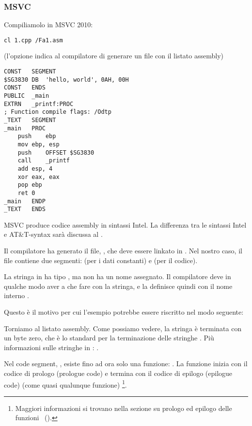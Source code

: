 \subsubsection{MSVC}

Compiliamolo in MSVC 2010:

\begin{lstlisting}
cl 1.cpp /Fa1.asm
\end{lstlisting}

(l'opzione  indica al compilatore di generare un file con il listato assembly)

\begin{lstlisting}[caption=MSVC 2010,style=customasmx86]
CONST	SEGMENT
$SG3830	DB	'hello, world', 0AH, 00H
CONST	ENDS
PUBLIC	_main
EXTRN	_printf:PROC
; Function compile flags: /Odtp
_TEXT	SEGMENT
_main	PROC
	push	ebp
	mov	ebp, esp
	push	OFFSET $SG3830
	call	_printf
	add	esp, 4
	xor	eax, eax
	pop	ebp
	ret	0
_main	ENDP
_TEXT	ENDS
\end{lstlisting}

MSVC produce codice assembly in sintassi Intel.
La differenza tra le sintassi Intel e AT\&T-syntax sarà discussa al .

Il compilatore ha generato il file, , che deve essere linkato in .
Nel nostro caso, il file contiene due segmenti:  (per i dati constanti) e  (per il codice).

\label{string_is_const_char}
La stringa  in \CCpp ha tipo , ma non ha un nome assegnato.
Il compilatore deve in qualche modo aver a che fare con la stringa, e la definisce quindi con il nome interno .

Questo è il motivo per cui l'esempio potrebbe essere riscritto nel modo seguente:



Torniamo al listato assembly. Come possiamo vedere, la stringa è terminata con un byte zero, che è lo standard per la terminazione delle stringhe \CCpp.
Più informazioni sulle stringhe in \CCpp: .

Nel code segment, , esiste fino ad ora solo una funzione: \main{}.
La funzione \main inizia con il codice di prologo (prologue code) e termina con il codice di epilogo (epilogue code) (come quasi qualunque funzione)
\footnote{Maggiori informazioni si trovano nella sezione su prologo ed epilogo delle funzioni ~().}.

